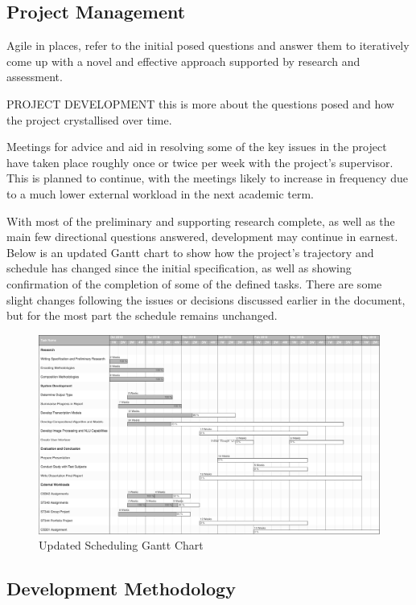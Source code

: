 \documentclass[12pt,]{article}
\begin{document}
\hypertarget{project-management}{%
\subsection{Project Management}\label{project-management}}

Agile in places, refer to the initial posed questions and answer them to
iteratively come up with a novel and effective approach supported by
research and assessment.

PROJECT DEVELOPMENT this is more about the questions posed and how the
project crystallised over time.

Meetings for advice and aid in resolving some of the key issues in the
project have taken place roughly once or twice per week with the
project's supervisor. This is planned to continue, with the meetings
likely to increase in frequency due to a much lower external workload in
the next academic term.

With most of the preliminary and supporting research complete, as well
as the main few directional questions answered, development may continue
in earnest. Below is an updated Gantt chart to show how the project's
trajectory and schedule has changed since the initial specification, as
well as showing confirmation of the completion of some of the defined
tasks. There are some slight changes following the issues or decisions
discussed earlier in the document, but for the most part the schedule
remains unchanged.

\begin{figure}
\centering
\includegraphics{diss_gantt.png}
\caption{Updated Scheduling Gantt Chart}
\end{figure}

\hypertarget{development-methodology}{%
\subsection{Development Methodology}\label{development-methodology}}
\end{document}
